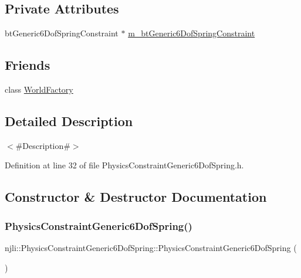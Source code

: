 \subsection*{Private Attributes}
\begin{DoxyCompactItemize}
\item 
bt\+Generic6\+Dof\+Spring\+Constraint $\ast$ \mbox{\hyperlink{classnjli_1_1_physics_constraint_generic6_dof_spring_a493a869835cd8138ecf3b347b9aa7373}{m\+\_\+bt\+Generic6\+Dof\+Spring\+Constraint}}
\end{DoxyCompactItemize}
\subsection*{Friends}
\begin{DoxyCompactItemize}
\item 
class \mbox{\hyperlink{classnjli_1_1_physics_constraint_generic6_dof_spring_acb96ebb09abe8f2a37a915a842babfac}{World\+Factory}}
\end{DoxyCompactItemize}


\subsection{Detailed Description}
$<$\#\+Description\#$>$ 

Definition at line 32 of file Physics\+Constraint\+Generic6\+Dof\+Spring.\+h.



\subsection{Constructor \& Destructor Documentation}
\mbox{\label{classnjli_1_1_physics_constraint_generic6_dof_spring_a3477772fafe8745a8963235b7eddad65}} 
\subsubsection{\texorpdfstring{Physics\+Constraint\+Generic6\+Dof\+Spring()}{PhysicsConstraintGeneric6DofSpring()}\hspace{0.1cm}{\footnotesize\ttfamily [1/3]}}
{\footnotesize\ttfamily njli\+::\+Physics\+Constraint\+Generic6\+Dof\+Spring\+::\+Physics\+Constraint\+Generic6\+Dof\+Spring (\begin{DoxyParamCaption}{ }\end{DoxyParamCaption})\hspace{0.3cm}{\ttfamily [protected]}}

